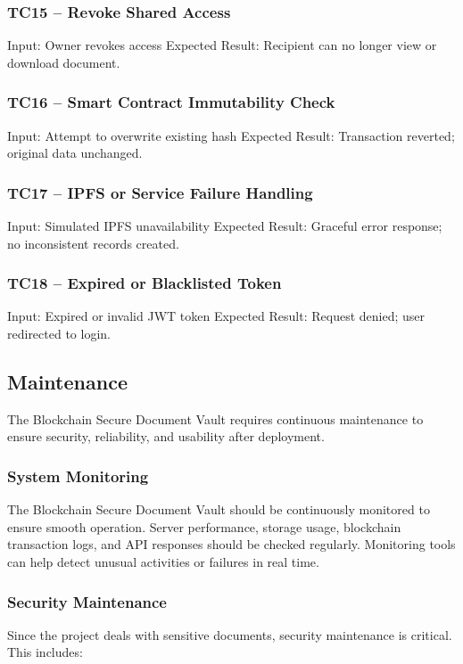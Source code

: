 \documentclass[12pt]{article}
\begin{document}
\subsubsection{TC15 -- Revoke Shared Access} 
Input: Owner revokes access \newline
Expected Result: Recipient can no longer view or download document.

\subsubsection{TC16 -- Smart Contract Immutability Check} 
Input: Attempt to overwrite existing hash \newline
Expected Result: Transaction reverted; original data unchanged.

\subsubsection{TC17 -- IPFS or Service Failure Handling} 
Input: Simulated IPFS unavailability \newline
Expected Result: Graceful error response; no inconsistent records created.

\subsubsection{TC18 -- Expired or Blacklisted Token} 
Input: Expired or invalid JWT token \newline
Expected Result: Request denied; user redirected to login.

\subsection{Maintenance}

The Blockchain Secure Document Vault requires continuous maintenance to ensure security, reliability, and usability after deployment.

\subsubsection{System Monitoring}
The Blockchain Secure Document Vault should be continuously monitored to ensure smooth operation. Server performance, storage usage, blockchain transaction logs, and API responses should be checked regularly. Monitoring tools can help detect unusual activities or failures in real time.

\subsubsection{Security Maintenance}
Since the project deals with sensitive documents, security maintenance is critical. This includes:
\end{document}
